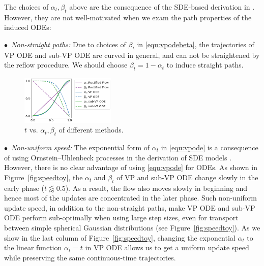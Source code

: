 The choices 
of $\alpha_t,\beta_t$ 
above  are the consequence of the 
SDE-based derivation in \cite{song2020score}. %
However, 
they are not well-motivated when we exam the path properties  of the induced  
ODEs:  %



\emph{$\bullet$~Non-straight paths:} 
Due to choices of $\beta_t$ in  \eqref{equ:vpodebeta}, the trajectories of VP ODE and sub-VP ODE are curved in general,  
and can not be straightened by the reflow procedure. 
We should choose 
 $\beta_t = 1-\alpha_t$ to induce straight paths. 


\begin{figure}
  \vspace{-1\baselineskip}  
  \begin{center}
    \includegraphics[width=0.4\textwidth]{arxiv_figures/alpha_beta.png}
  \end{center}
  \vspace{-.5\baselineskip}
  \caption{$t$ vs. $\alpha_t,\beta_t$ of different methods. 
  }
  \vspace{-.5\baselineskip}  
\end{figure}
\emph{$\bullet$~Non-uniform speed:} 
The exponential form of $\alpha_t$  in \eqref{equ:vpode} 
is a consequence of using  Ornstein–Uhlenbeck processes in the derivation of SDE models \cite{song2020score, ho2020denoising}.  
However, there is no clear advantage of using \eqref{equ:vpode} for  ODEs. 
As shown in Figure~\ref{fig:speedtoy},  
the $\alpha_t$ and $\beta_t$ of VP and sub-VP ODE 
change slowly in the early phase ($t{\scriptstyle \lessapprox} 0.5$).
As a result, 
the flow also moves slowly in beginning 
and hence most of the updates are concentrated in the later phase. 
Such non-uniform update speed, 
in addition to the non-straight paths,  
make VP ODE and sub-VP ODE perform sub-optimally 
when using large step sizes, even
for transport between simple spherical Gaussian distributions (see Figure~\ref{fig:speedtoy}).  
As we show in the last column of Figure~\ref{fig:speedtoy}, 
 changing the exponential $\alpha_t$ to the  linear function $\alpha_t = t$ in VP ODE 
 allows us to get a uniform update speed while 
 preserving the same continuous-time trajectories.






